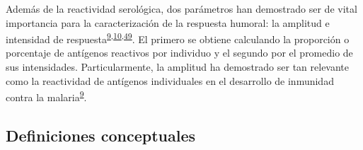 \documentclass[a4paper]{article}
\begin{document}
\begin{enumerate}
\begin{enumerate}
    Además de la reactividad serológica, dos parámetros han demostrado
    ser de vital importancia para la caracterización de la respuesta
    humoral: la amplitud e intensidad de
    respuesta\textsuperscript{\protect\hyperlink{ref-crompton2010}{9},\protect\hyperlink{ref-Helb2015exposure}{10},\protect\hyperlink{ref-King2015FOC}{49}}.
    El primero se obtiene calculando la proporción o porcentaje de
    antígenos reactivos por individuo y el segundo por el promedio de
    sus intensidades. Particularmente, la amplitud ha demostrado ser tan
    relevante como la reactividad de antígenos individuales en el
    desarrollo de inmunidad contra la
    malaria\textsuperscript{\protect\hyperlink{ref-crompton2010}{9}}. 
  \end{enumerate}
\end{enumerate}

\subsection{Definiciones conceptuales}\label{definiciones-conceptuales}
\end{document}
